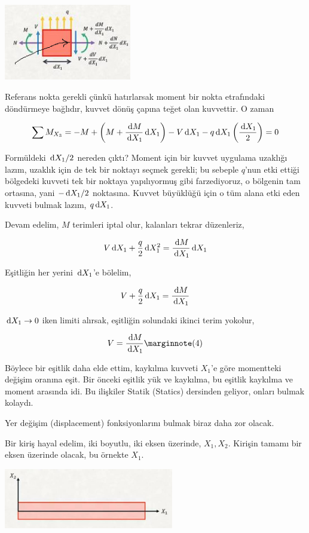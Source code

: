 \documentclass[12pt,fleqn]{article}\usepackage{../../common}
\begin{document}
\includegraphics[width=15em]{phy_020_strs_02_11.jpg}

Referans nokta gerekli çünkü hatırlarsak moment bir nokta etrafındaki
döndürmeye bağlıdır, kuvvet dönüş çapına teğet olan kuvvettir. O zaman 

$$
\sum M_{X_3} = -M + \left( M + \frac{\,\mathrm{d} M}{\,\mathrm{d} X_1} \,\mathrm{d} X_1 \right) -
V \,\mathrm{d} X_1 - q \,\mathrm{d} X_1 \left( \frac{\,\mathrm{d} X_1}{2}  \right) = 0
$$

Formüldeki $\,\mathrm{d} X_1 / 2$ nereden çıktı? Moment için bir kuvvet uygulama uzaklığı
lazım, uzaklık için de tek bir noktayı seçmek gerekli; bu sebeple $q$'nun etki
ettiği bölgedeki kuvveti tek bir noktaya yapılıyormuş gibi farzediyoruz, o
bölgenin tam ortasına, yani $- \,\mathrm{d} X_1 / 2$ noktasına.  Kuvvet büyüklüğü için o
tüm alana etki eden kuvveti bulmak lazım, $q \,\mathrm{d} X_1$.

Devam edelim, $M$ terimleri iptal olur, kalanları tekrar düzenleriz,

$$
V \,\mathrm{d} X_1 + \frac{q}{2} \,\mathrm{d} X_1^2 = \frac{\,\mathrm{d} M}{\,\mathrm{d} X_1} \,\mathrm{d} X_1
$$

Eşitliğin her yerini $\,\mathrm{d} X_1$'e bölelim,

$$
V + \frac{q}{2} \,\mathrm{d} X_1 = \frac{\,\mathrm{d} M}{\,\mathrm{d} X_1} 
$$

$\,\mathrm{d} X_1 \to 0$ iken limiti alırsak, eşitliğin solundaki ikinci terim yokolur,

$$
V = \frac{\ud M}{\ud X_1}
\mlabel{4}
$$

Böylece bir eşitlik daha elde ettim, kaykılma kuvveti $X_1$'e göre momentteki
değişim oranına eşit. Bir önceki eşitlik yük ve kaykılma, bu eşitlik kaykılma ve
moment arasında idi. Bu ilişkiler Statik (Statics) dersinden geliyor, onları
bulmak kolaydı.

Yer değişim (displacement) fonksiyonlarını bulmak biraz daha zor olacak. 

Bir kiriş hayal edelim, iki boyutlu, iki eksen üzerinde, $X_1,X_2$.  Kirişin
tamamı bir eksen üzerinde olacak, bu örnekte $X_1$.

\includegraphics[width=20em]{phy_020_strs_02_12.jpg}
\end{document}
